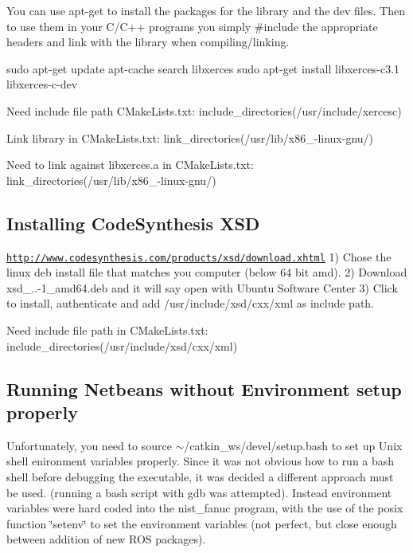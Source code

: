 You can use apt-\/get to install the packages for the library and the dev files. Then to use them in your C/\-C++ programs you simply \#include the appropriate headers and link with the library when compiling/linking. \begin{DoxyVerb}sudo apt-get update
apt-cache search libxerces
sudo apt-get install libxerces-c3.1 libxerces-c-dev
\end{DoxyVerb}


Need include file path C\-Make\-Lists.\-txt\-: include\-\_\-directories(/usr/include/xercesc)

Link library in C\-Make\-Lists.\-txt\-: link\-\_\-directories(/usr/lib/x86\-\_-\/linux-\/gnu/)

Need to link against libxerces.\-a in C\-Make\-Lists.\-txt\-: link\-\_\-directories(/usr/lib/x86\-\_-\/linux-\/gnu/)

\subsection*{Installing Code\-Synthesis X\-S\-D }

\href{http://www.codesynthesis.com/products/xsd/download.xhtml}{\tt http\-://www.\-codesynthesis.\-com/products/xsd/download.\-xhtml} 1) Chose the linux deb install file that matches you computer (below 64 bit amd). 2) Download xsd\-\_..-\/1\-\_\-amd64.\-deb and it will say open with Ubuntu Software Center 3) Click to install, authenticate and add /usr/include/xsd/cxx/xml as include path.

Need include file path in C\-Make\-Lists.\-txt\-: include\-\_\-directories(/usr/include/xsd/cxx/xml)

\subsection*{Running Netbeans without Environment setup properly }

Unfortunately, you need to source $\sim$/catkin\-\_\-ws/devel/setup.bash to set up Unix shell enironment variables properly. Since it was not obvious how to run a bash shell before debugging the executable, it was decided a different approach must be used. (running a bash script with gdb was attempted). Instead environment variables were hard coded into the nist\-\_\-fanuc program, with the use of the posix function \char`\"{}setenv\char`\"{} to set the environment variables (not perfect, but close enough between addition of new R\-O\-S packages).


